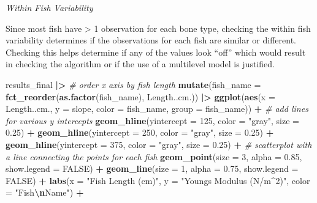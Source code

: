 \documentclass[
]{article}
\newenvironment{Shaded}{\begin{snugshade}}{\end{snugshade}}
\newcommand{\AttributeTok}[1]{\textcolor[rgb]{0.13,0.29,0.53}{#1}}
\newcommand{\CommentTok}[1]{\textcolor[rgb]{0.56,0.35,0.01}{\textit{#1}}}
\newcommand{\ConstantTok}[1]{\textcolor[rgb]{0.56,0.35,0.01}{#1}}
\newcommand{\DecValTok}[1]{\textcolor[rgb]{0.00,0.00,0.81}{#1}}
\newcommand{\FloatTok}[1]{\textcolor[rgb]{0.00,0.00,0.81}{#1}}
\newcommand{\FunctionTok}[1]{\textcolor[rgb]{0.13,0.29,0.53}{\textbf{#1}}}
\newcommand{\NormalTok}[1]{#1}
\newcommand{\SpecialCharTok}[1]{\textcolor[rgb]{0.81,0.36,0.00}{\textbf{#1}}}
\newcommand{\StringTok}[1]{\textcolor[rgb]{0.31,0.60,0.02}{#1}}
\begin{document}
\emph{Within Fish Variability}

Since most fish have \textgreater{} 1 observation for each bone type,
checking the within fish variability determines if the observations for
each fish are similar or different. Checking this helps determine if any
of the values look ``off'' which would result in checking the algorithm
or if the use of a multilevel model is justified.

\begin{Shaded}
\begin{Highlighting}[]
\NormalTok{results\_final }\SpecialCharTok{|\textgreater{}}
  \CommentTok{\# order x axis by fish length}
  \FunctionTok{mutate}\NormalTok{(}\AttributeTok{fish\_name =} \FunctionTok{fct\_reorder}\NormalTok{(}\FunctionTok{as.factor}\NormalTok{(fish\_name), Length..cm.)) }\SpecialCharTok{|\textgreater{}}
  \FunctionTok{ggplot}\NormalTok{(}\FunctionTok{aes}\NormalTok{(}\AttributeTok{x =}\NormalTok{ Length..cm., }\AttributeTok{y =}\NormalTok{ slope, }\AttributeTok{color =}\NormalTok{ fish\_name, }\AttributeTok{group =}\NormalTok{ fish\_name)) }\SpecialCharTok{+}
  \CommentTok{\# add lines for various y intercepts}
  \FunctionTok{geom\_hline}\NormalTok{(}\AttributeTok{yintercept =} \DecValTok{125}\NormalTok{, }\AttributeTok{color =} \StringTok{"gray"}\NormalTok{, }\AttributeTok{size =} \FloatTok{0.25}\NormalTok{) }\SpecialCharTok{+} 
  \FunctionTok{geom\_hline}\NormalTok{(}\AttributeTok{yintercept =} \DecValTok{250}\NormalTok{, }\AttributeTok{color =} \StringTok{"gray"}\NormalTok{, }\AttributeTok{size =} \FloatTok{0.25}\NormalTok{) }\SpecialCharTok{+} 
  \FunctionTok{geom\_hline}\NormalTok{(}\AttributeTok{yintercept =} \DecValTok{375}\NormalTok{, }\AttributeTok{color =} \StringTok{"gray"}\NormalTok{, }\AttributeTok{size =} \FloatTok{0.25}\NormalTok{) }\SpecialCharTok{+}
  \CommentTok{\# scatterplot with a line connecting the points for each fish}
  \FunctionTok{geom\_point}\NormalTok{(}\AttributeTok{size =} \DecValTok{3}\NormalTok{, }\AttributeTok{alpha =} \FloatTok{0.85}\NormalTok{, }\AttributeTok{show.legend =} \ConstantTok{FALSE}\NormalTok{) }\SpecialCharTok{+}
  \FunctionTok{geom\_line}\NormalTok{(}\AttributeTok{size =} \DecValTok{1}\NormalTok{, }\AttributeTok{alpha =} \FloatTok{0.75}\NormalTok{, }\AttributeTok{show.legend =} \ConstantTok{FALSE}\NormalTok{) }\SpecialCharTok{+}
  \FunctionTok{labs}\NormalTok{(}\AttributeTok{x =} \StringTok{"Fish Length (cm)"}\NormalTok{, }\AttributeTok{y =} \StringTok{"Young\textquotesingle{}s Modulus (N/m\^{}2)"}\NormalTok{, }\AttributeTok{color =} \StringTok{"Fish}\SpecialCharTok{\textbackslash{}n}\StringTok{Name"}\NormalTok{) }\SpecialCharTok{+}

\end{Highlighting}
\end{Shaded}
\end{document}

